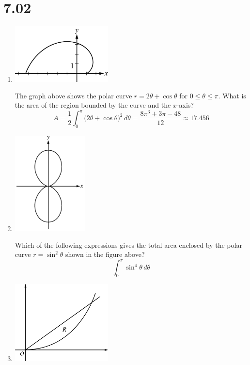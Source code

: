 \documentclass[12pt]{article}
\begin{document}
\section*{7.02}
\begin{enumerate}
	\item 
	      \begin{center}
	      	\includegraphics[width = 2in]{7.021}
	      \end{center}
	      The graph above shows the polar curve $r=2\theta + \cos\theta$ for $0\leq\theta\leq\pi$. What is the area of the region bounded by the curve and the $x$-axis?
	      $$A=\frac{1}{2} \int_{0}^{\pi} \big(2\theta + \cos\theta\big)^2\, d\theta = \frac{8\pi^3+3\pi-48}{12} \approx \boxed{17.456}$$
	\item 
	      \begin{center}
	      	\includegraphics[width = 1.5in]{7.022}
	      \end{center}
	      Which of the following expressions gives the total area enclosed by the polar curve $r=\sin^2\theta$ shown in the figure above?
	      $$\boxed{\int_{0}^{\pi} \sin^4 \theta \, d\theta}$$
	\item 
	      \begin{center}
	      	\includegraphics[width=2in]{7.023.png}

\end{center}
\end{enumerate}
\end{document}
